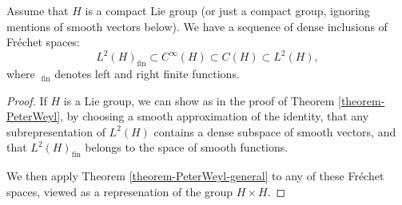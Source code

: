 \begin{proposition}
\label{proposition-denseinclusions} 
Assume that $H$ is a compact Lie group (or just a compact group, ignoring mentions of smooth vectors below). We have a sequence of dense inclusions of Fr\'echet spaces:
\begin{equation}
 L^2(H)_{\text{fin}} \subset C^\infty(H) \subset C(H)\subset L^2(H),
\end{equation}
where $~_{\text{fin}}$ denotes left and right finite functions.
\end{proposition}

\begin{proof}
If $H$ is a Lie group, we can show as in the proof of Theorem \ref{theorem-PeterWeyl}, by choosing a smooth approximation of the identity, that any subrepresentation of $L^2(H)$ contains a dense subspace of smooth vectors, and that $L^2(H)_{\text{fin}}$ belongs to the space of smooth functions. 


We then apply Theorem \ref{theorem-PeterWeyl-general} to any of these Fr\'echet spaces, viewed as a represenation of the group $H\times H$. 


 
\end{proof}



















